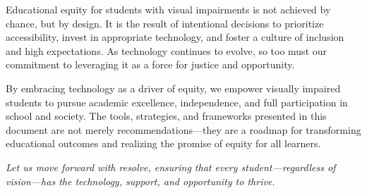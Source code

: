 Educational equity for students with visual impairments is not achieved by chance, but by design. It is the result of intentional decisions to prioritize accessibility, invest in appropriate technology, and foster a culture of inclusion and high expectations. As technology continues to evolve, so too must our commitment to leveraging it as a force for justice and opportunity.

By embracing technology as a driver of equity, we empower visually impaired students to pursue academic excellence, independence, and full participation in school and society. The tools, strategies, and frameworks presented in this document are not merely recommendations—they are a roadmap for transforming educational outcomes and realizing the promise of equity for all learners.

\bigskip

\noindent\textit{Let us move forward with resolve, ensuring that every student—regardless of vision—has the technology, support, and opportunity to thrive.}
